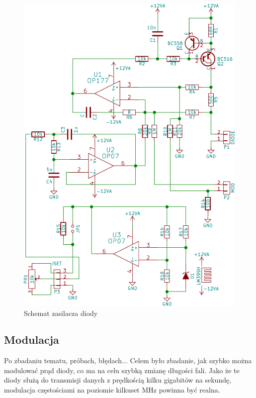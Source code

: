\documentclass[a4paper,10pt]{article}
\begin{document}
\begin{figure}
\begin{center}
 \includegraphics{./obrazki/VcselPSU.pdf}
\end{center}
\caption{Schemat zasilacza diody}
\label{sch-psu}
\end{figure}

\subsection{Modulacja}

Po zbadaniu tematu, próbach, błędach...
Celem było zbadanie, jak szybko można modulować prąd diody, co ma na celu szybką zmianę długości fali. Jako że te diody służą do transmisji danych z prędkością kilku gigabitów na sekundę, modulacja częstościami na poziomie kilkuset MHz powinna być realna. 
\end{document}
